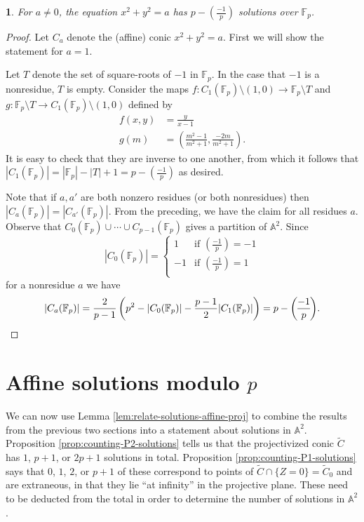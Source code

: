 \documentclass[10pt,a4paper]{amsart}
\numberwithin{equation}{section}
\numberwithin{figure}{section}
\numberwithin{table}{section}
\theoremstyle{definition}
\theoremstyle{plain}
\theoremstyle{remark}
\theoremstyle{plain}
\theoremstyle{definition}
\theoremstyle{plain}
\newtheorem{prop}[thm]{\protect\propositionname}
\theoremstyle{plain}
\providecommand{\propositionname}{Proposition}
\newcommand{\legendre}[2]{\genfrac{(}{)}{}{}{#1}{#2}}
\newcommand{\A}{\mathbb{A}}
\newcommand{\F}{\mathbb{F}}
\begin{document}
	\begin{prop}\label{prop:circle-solutions} 
		For $a \neq 0$, the equation $x^2 + y^2 = a$ has $p - \legendre{-1}{p}$ 
		solutions over $\F_p$.
	\end{prop} 
	\begin{proof} 
		Let $C_a$ denote the (affine) conic $x^2 + y^2 = a$. 
		First we will show the statement for $a=1$.
		
		Let $T$ denote the set of square-roots of $-1$ in $\F_p$. In the case
		that $-1$ is a nonresidue, $T$ is empty. Consider the maps $f\colon C_1(\F_p)
		\setminus (1,0) \to \F_p \setminus T$ and $g\colon \F_p
		\setminus T \to C_1(\F_p) \setminus (1,0)$ defined by 
		\begin{align*} 
		f(x,y) &= \frac{y}{x-1} \\ 
		g(m) &= \left(\frac{m^2 - 1}{m^2 + 1}, \frac{-2m}{m^2 + 1}\right).
		\end{align*} 
		It is easy to check that they are inverse to one
		another, from which it follows that $|C_1(\F_p)| = |\F_p| - |T| + 1 = p -
		\legendre{-1}{p}$ as desired.
		
		Note that if $a,a'$ are both nonzero residues (or both nonresidues)
		then $|C_a(\F_p)| = |C_{a'}(\F_p)|$. From the preceding, we have the claim for all residues
		$a$. Observe that $C_0(\F_p) \cup \cdots \cup C_{p-1}(\F_p)$ gives a partition of
		$\mathbb{A}^2$. Since 
		\[ |C_0(\F_p)| = \begin{cases}
		1 & \text{if } \legendre{-1}{p} = -1 \\
		-1 & \text{if } \legendre{-1}{p} = 1 \\
		\end{cases} \] 
		for a nonresidue $a$ we have 
		\[ |C_a(\F_p)| = \frac{2}{p-1} 
		\left(p^2 - |C_0(\F_p)| - \frac{p-1}{2}|C_1(\F_p)|\right) = 
		p - \legendre{-1}{p}. \qedhere \] 
	\end{proof}
	
	\section{Affine solutions modulo $p$}
	\label{sec:affine-solutions}
	
	We can now use Lemma \ref{lem:relate-solutions-affine-proj} to combine the
	results from the previous two sections into a statement about solutions in $\A^2$. Proposition \ref{prop:counting-P2-solutions} tells us that the projectivized conic $\widetilde{C}$ has $1$, $p+1$, or $2p+1$ solutions in total. Proposition \ref{prop:counting-P1-solutions} says that $0$, $1$, $2$, or $p+1$ of these correspond to points of $\widetilde{C}\cap \{Z = 0\} = \widetilde{C}_0$ and are extraneous, in that they lie ``at infinity'' in the projective plane. These need to be deducted from the total in order to determine the number of solutions in $\A^2$.
	
\end{document}
